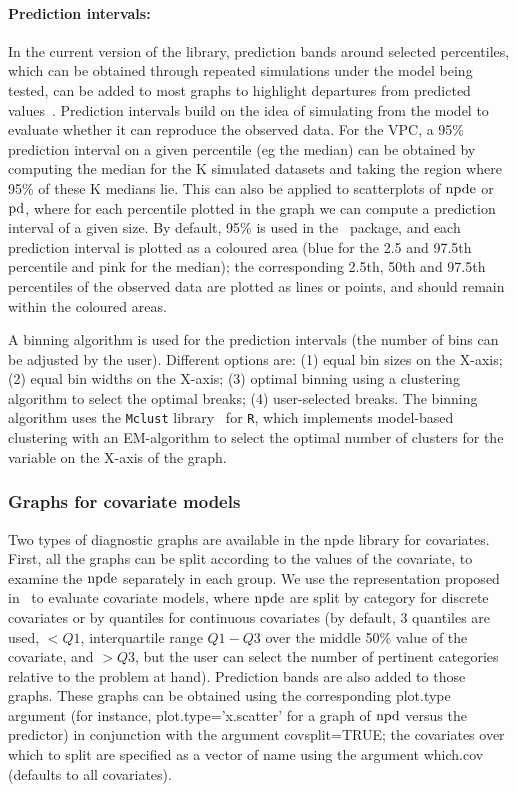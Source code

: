 \paragraph{Prediction intervals:} In the current version of the library, prediction bands around selected 
percentiles, which can be obtained through repeated simulations under the model being tested, can be added to most 
graphs to highlight departures from predicted values~\cite{Comets10}. Prediction intervals build on the idea of 
simulating from the model to evaluate whether it can reproduce the observed data. For the VPC, a 95\% prediction 
interval on a given percentile (eg the median) can be obtained by computing the median for the K simulated datasets 
and taking the region where 95\% of these K medians lie. This can also be applied to scatterplots of ${\rm npde}$ or 
${\rm pd}$, where for each percentile plotted in the graph we can compute a prediction interval of a given size. By 
default, 95\% is used in the \npde~package, and each prediction interval is plotted as a coloured area (blue for 
the 2.5 and 97.5th percentile and pink for the median); the corresponding 2.5th, 50th and 97.5th percentiles of the 
observed data are plotted as lines or points, and should remain within the coloured areas.

A binning algorithm is used for the prediction intervals (the number of bins can be adjusted by the user). 
Different options are: (1) equal bin sizes on the X-axis; (2) equal bin widths on the X-axis; (3) optimal binning 
using a clustering algorithm to select the optimal breaks; (4) user-selected breaks. The binning algorithm uses the 
\texttt{Mclust} library~\cite{Fraley02,Fraley06} for \texttt{R}, which implements model-based clustering with an 
EM-algorithm to select the optimal number of clusters for the variable on the X-axis of the graph.

\subsubsection{Graphs for covariate models} 

\hskip 18pt Two types of diagnostic graphs are available in the {\sf npde} library for covariates. First, all the 
graphs can be split according to the values of the covariate, to examine the ${\rm npde}$ separately in each group. We 
use the representation proposed in~\cite{Brendel10} to evaluate covariate models, where ${\rm npde}$ are split by 
category for discrete covariates or by quantiles for continuous covariates (by default, 3 quantiles are used, 
$<Q1$, interquartile range $Q1-Q3$ over the middle 50\% value of the covariate, and $>Q3$, but the user can select 
the number of pertinent categories relative to the problem at hand). Prediction bands are also added to those 
graphs. These graphs can be obtained using the corresponding {\sf plot.type} argument (for instance, {\sf 
plot.type='x.scatter'} for a graph of ${\rm npd}$ versus the predictor) in conjunction with the argument {\sf 
covsplit=TRUE}; the covariates over which to split are specified as a vector of name using the argument {\sf 
which.cov} (defaults to all covariates).

